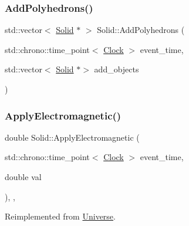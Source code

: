 \mbox{\label{classSolid_a649ba1103a9889bc9e45256633dc72c3}} 
\subsubsection{\texorpdfstring{Add\+Polyhedrons()}{AddPolyhedrons()}}
{\footnotesize\ttfamily std\+::vector$<$ \mbox{\hyperlink{classSolid}{Solid}} $\ast$ $>$ Solid\+::\+Add\+Polyhedrons (\begin{DoxyParamCaption}\item[{std\+::chrono\+::time\+\_\+point$<$ \mbox{\hyperlink{universe_8h_a0ef8d951d1ca5ab3cfaf7ab4c7a6fd80}{Clock}} $>$}]{event\+\_\+time,  }\item[{std\+::vector$<$ \mbox{\hyperlink{classSolid}{Solid}} $\ast$$>$}]{add\+\_\+objects }\end{DoxyParamCaption})}

\mbox{\label{classSolid_ab546d607d6f0bf70dc5e6bbac8baf287}} 
\subsubsection{\texorpdfstring{Apply\+Electromagnetic()}{ApplyElectromagnetic()}}
{\footnotesize\ttfamily double Solid\+::\+Apply\+Electromagnetic (\begin{DoxyParamCaption}\item[{std\+::chrono\+::time\+\_\+point$<$ \mbox{\hyperlink{universe_8h_a0ef8d951d1ca5ab3cfaf7ab4c7a6fd80}{Clock}} $>$}]{event\+\_\+time,  }\item[{double}]{val }\end{DoxyParamCaption})\hspace{0.3cm}{\ttfamily [inline]}, {\ttfamily [final]}, {\ttfamily [virtual]}}



Reimplemented from \mbox{\hyperlink{classUniverse_a1f787da78fa196ba635db21a9e91dabb}{Universe}}.

\mbox{\label{classSolid_a46702e3109994b310eb4f1fba5610e0b}} 
